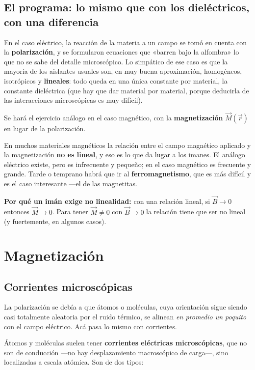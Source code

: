 \documentclass[12pt,a4paper]{article}
\begin{document}
\subsection{El programa: lo mismo que con los dieléctricos, con una diferencia}

En el caso eléctrico, la reacción de la materia a un campo se tomó en cuenta
con la \textbf{polarización}, y se formularon ecuaciones que «barren bajo la
alfombra» lo que no se sabe del detalle microscópico. Lo simpático de ese caso
es que la mayoría de los aislantes usuales son, en muy buena aproximación,
homogéneos, isotrópicos y \textbf{lineales}: todo queda en una única constante por
material, la constante dieléctrica (que hay que dar material por material,
porque deducirla de las interacciones microscópicas es muy difícil).

Se hará el ejercicio análogo en el caso magnético, con la \textbf{magnetización}
$\vec M(\vec r)$ en lugar de la polarización.

\begin{notebox}[La diferencia]
En muchos materiales magnéticos la relación entre el campo
magnético aplicado y la magnetización \textbf{no es lineal}, y eso es lo que da
lugar a los imanes. El análogo eléctrico existe, pero es infrecuente y
pequeño; en el caso magnético es frecuente y grande. Tarde o temprano habrá
que ir al \textbf{ferromagnetismo}, que es más difícil y es el caso interesante
---el de las magnetitas.
\end{notebox}

\textbf{Por qué un imán exige no linealidad:} con una relación lineal, si
$\vec B\to0$ entonces $\vec M\to0$. Para tener $\vec M\neq0$ con $\vec B\to0$
la relación tiene que ser no lineal (y fuertemente, en algunos casos).

\section{Magnetización}

\subsection{Corrientes microscópicas}

La polarización se debía a que átomos o moléculas, cuya orientación sigue
siendo casi totalmente aleatoria por el ruido térmico, se alinean \emph{en promedio
un poquito} con el campo eléctrico. Acá pasa lo mismo con corrientes.

Átomos y moléculas suelen tener \textbf{corrientes eléctricas microscópicas}, que no
son de conducción ---no hay desplazamiento macroscópico de carga---, sino
localizadas a escala atómica. Son de dos tipos:
\end{document}
